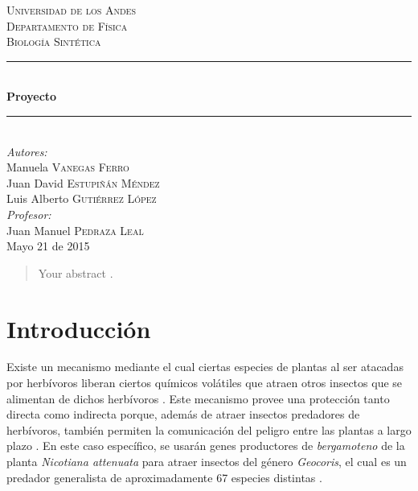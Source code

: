 \documentclass[12pt]{article}
\begin{document}
\begin{titlepage}

\newcommand{\HRule}{\rule{\linewidth}{0.5mm}}

\center

\textsc{\LARGE Universidad de los Andes}\\[1.5cm]
\textsc{\Large Departamento de F\'isica}\\[0.5cm]
\textsc{\large Biolog\'ia Sint\'etica}\\[0.5cm] 

\HRule \\[0.4cm]
{ \huge \bfseries {} Proyecto}\\[0.4cm]
\HRule \\[1.5cm]
 

\Large \emph{Autores:}\\
Manuela \textsc{Vanegas Ferro}\\
Juan David \textsc{Estupi\~n\'an M\'endez}\\
Luis Alberto \textsc{Guti\'errez L\'opez}\\[2cm]

\Large \emph{Profesor:}\\
Juan Manuel \textsc{Pedraza Leal}\\[3cm]


{\large Mayo 21 de 2015}\\[2cm]

\vfill

\end{titlepage}

\tableofcontents
\pagebreak

\begin{abstract}
  Your abstract \cite{cleland67}  \cite{harada09a} \cite{engerberg-kulka04}.
\end{abstract}

\section{Introducci\'on}

Existe un mecanismo mediante el cual ciertas especies de plantas al ser atacadas por herbívoros liberan ciertos químicos volátiles que atraen otros insectos que se alimentan de dichos herbívoros \cite{kressler01} \cite{taiz10} \cite{takabayashi96} \cite{turlings95} . Este mecanismo provee una protección tanto directa como indirecta porque, además de atraer insectos predadores de herb\'ivoros, también permiten la comunicación del peligro entre las plantas a largo plazo \cite{kressler01} \cite{taiz10}. En este caso específico, se usarán genes productores de \emph{bergamoteno} de la planta \emph{Nicotiana attenuata} para atraer insectos del género \emph{Geocoris}, el cual es un predador generalista de aproximadamente 67 especies distintas \cite{crocker80}.\\
\end{document}
